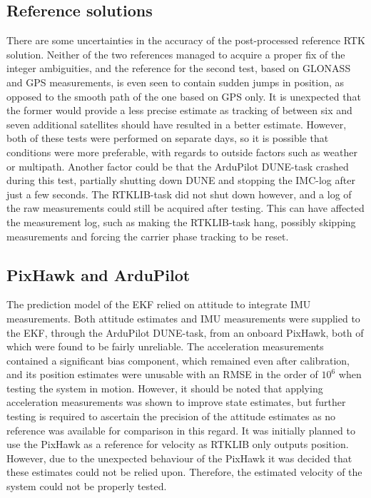     \subsection{Reference solutions}
        There are some uncertainties in the accuracy of the post-processed reference RTK solution. Neither of the two references managed to acquire a proper fix of the integer ambiguities, and the reference for the second test, based on GLONASS and GPS measurements, is even seen to contain sudden jumps in position, as opposed to the smooth path of the one based on GPS only. It is unexpected that the former would provide a less precise estimate as tracking of between six and seven additional satellites should have resulted in a better estimate. However, both of these tests were performed on separate days, so it is possible that conditions were more preferable, with regards to outside factors such as weather or multipath. Another factor could be that the ArduPilot DUNE-task crashed during this test, partially shutting down DUNE and stopping the IMC-log after just a few seconds. The RTKLIB-task did not shut down however, and a log of the raw measurements could still be acquired after testing. This can have affected the measurement log, such as making the RTKLIB-task hang, possibly skipping measurements and forcing the carrier phase tracking to be reset.\\
    
    \subsection{PixHawk and ArduPilot}
        The prediction model of the EKF relied on attitude to integrate IMU measurements. Both attitude estimates and IMU measurements were supplied to the EKF, through the ArduPilot DUNE-task, from an onboard PixHawk, both of which were found to be fairly unreliable. The acceleration measurements contained a significant bias component, which remained even after calibration, and its position estimates were unusable with an RMSE in the order of $10^6$ when testing the system in motion. However, it should be noted that applying acceleration measurements was shown to improve state estimates, but further testing is required to ascertain the precision of the attitude estimates as no reference was available for comparison in this regard. It was initially planned to use the PixHawk as a reference for velocity as RTKLIB only outputs position. However, due to the unexpected behaviour of the PixHawk it was decided that these estimates could not be relied upon. Therefore, the estimated velocity of the system could not be properly tested.
    

